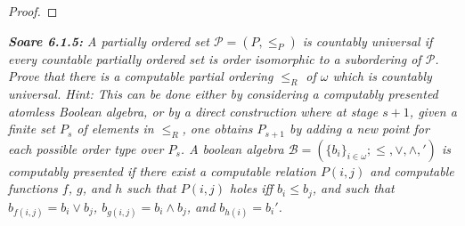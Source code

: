 \documentclass{article}
\begin{document}
\begin{proof}
  \end{proof}

\it \textbf{Soare 6.1.5:} A partially ordered set $\mathcal{P}=(P,\leq_P)$
  is countably universal if every countable partially ordered set is order
  isomorphic to a subordering of $\mathcal{P}$. Prove that there is a
  computable partial ordering $\leq_R$ of $\omega$ which is countably
  universal. Hint: This can be done either by considering a computably
  presented atomless Boolean algebra, or by a direct construction where at
  stage $s+1$, given a finite set $P_s$ of elements in $\leq_R$, one
  obtains $P_{s+1}$ by adding a new point for each possible order type over
  $P_s$. A boolean algebra
  $\mathcal{B}=(\{b_i\}_{i\in\omega};\leq,\vee,\wedge,')$ is computably
  presented if there exist a computable relation $P(i,j)$ and computable
  functions $f$, $g$, and $h$ such that $P(i,j)$ holes iff $b_i\leq b_j$,
  and such that $b_{f(i,j)}=b_i\vee b_j$, $b_{g(i,j)}=b_i\wedge b_j$, and
  $b_{h(i)}=b_i'$.
\end{document}
